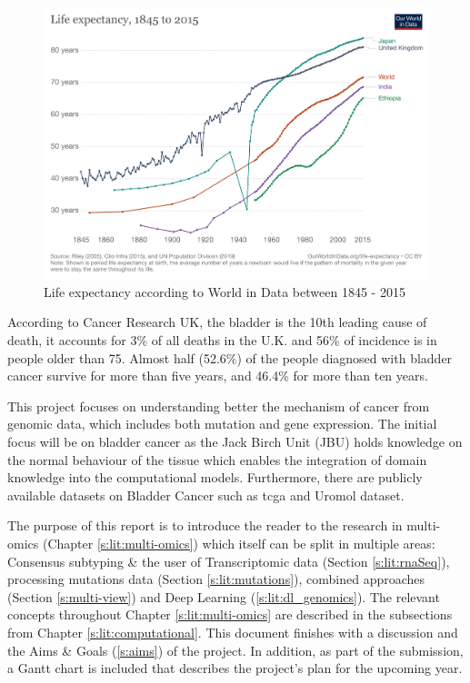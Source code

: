 \begin{figure}[!htb]
    \centering\includegraphics[width=1.0\textwidth,height=0.3\textheight,keepaspectratio]{Images/life-expectancy.png}
      \caption{Life expectancy according to World in Data between 1845 - 2015\cite{World_in_Data_undated-no}}
      \label{fig:life_expectancy}
\end{figure}


According to Cancer Research UK\cite{Cancer_Research_UK2015-cf}, the bladder is the 10th leading cause of death, it accounts for 3\% of all deaths in the U.K. and 56\% of incidence is in people older than 75. Almost half (52.6\%) of the people diagnosed with bladder cancer survive for more than five years, and 46.4\% for more than ten years. 

This project focuses on understanding better the mechanism of cancer from genomic data, which includes both mutation and gene expression. The initial focus will be on bladder cancer as the Jack Birch Unit (JBU) holds knowledge on the normal behaviour of the tissue which enables the integration of domain knowledge into the computational models. Furthermore, there are publicly available datasets on Bladder Cancer such as \acrfull{tcga}\cite{Tcga2018-sj} and Uromol dataset\cite{Lindskrog2021-ov, The_European_Genome-phenome_Archive_undated-pz}.

The purpose of this report is to introduce the reader to the research in multi-omics (Chapter \ref{s:lit:multi-omics}) which itself can be split in multiple areas: Consensus subtyping \& the user of Transcriptomic data (Section \ref{s:lit:rnaSeq}), processing mutations data (Section \ref{s:lit:mutations}), combined approaches (Section \ref{s:multi-view}) and Deep Learning (\ref{s:lit:dl_genomics}). The relevant concepts throughout  Chapter \ref{s:lit:multi-omics} are described in the subsections from Chapter \ref{s:lit:computational}. This document finishes with a discussion and the Aims \& Goals (\ref{s:aims}) of the project. In addition, as part of the submission, a Gantt chart is included that describes the project's plan for the upcoming year. 

